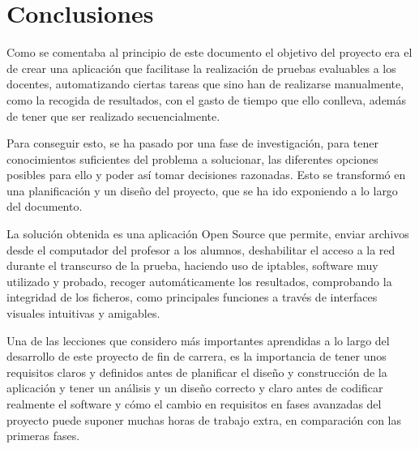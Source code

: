 

\label{chap:futuro}

\section{Conclusiones}
\label{sec:futuro:conclusiones}

Como se comentaba al principio de este documento el objetivo del proyecto era el de crear una aplicación que facilitase la realización de pruebas evaluables a los docentes, automatizando ciertas tareas que sino han de realizarse manualmente, como la recogida de resultados, con el gasto de tiempo que ello conlleva, además de tener que ser realizado secuencialmente.
\newline

Para conseguir esto, se ha pasado por una fase de investigación, para tener conocimientos suficientes del problema a solucionar, las diferentes opciones posibles para ello y poder así tomar decisiones razonadas. Esto se transformó en una planificación y un diseño del proyecto, que se ha ido exponiendo a lo largo del documento.
\newline

La solución obtenida es una aplicación Open Source que permite, enviar archivos desde el computador del profesor a los alumnos, deshabilitar el acceso a la red durante el transcurso de la prueba, haciendo uso de iptables, software muy utilizado y probado, recoger automáticamente los resultados, comprobando la integridad de los ficheros, como principales funciones a través de interfaces visuales intuitivas y amigables.
\newline


Una de las lecciones que considero más importantes aprendidas a lo largo del desarrollo de este proyecto de fin de carrera, es la importancia de tener unos requisitos claros y definidos antes de planificar el diseño y construcción de la aplicación y tener un análisis y un diseño correcto y claro antes de codificar realmente el software y cómo el cambio en requisitos en fases avanzadas del proyecto puede suponer muchas horas de trabajo extra, en comparación con las primeras fases.
\newline

